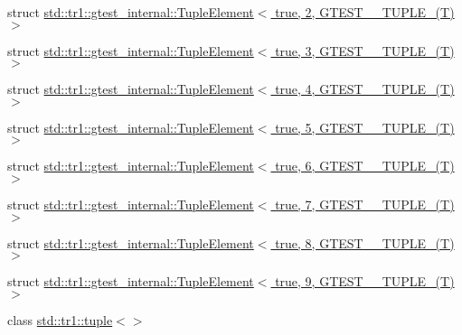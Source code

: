 \begin{DoxyCompactItemize}
\item 
struct \hyperlink{structstd_1_1tr1_1_1gtest__internal_1_1_tuple_element_3_01true_00_012_00_01_g_t_e_s_t__10___t_u_p_l_e___07_t_08_01_4}{std\-::tr1\-::gtest\-\_\-internal\-::\-Tuple\-Element$<$ true, 2, G\-T\-E\-S\-T\-\_\-\_\-\-T\-U\-P\-L\-E\-\_\-(\-T) $>$}
\item 
struct \hyperlink{structstd_1_1tr1_1_1gtest__internal_1_1_tuple_element_3_01true_00_013_00_01_g_t_e_s_t__10___t_u_p_l_e___07_t_08_01_4}{std\-::tr1\-::gtest\-\_\-internal\-::\-Tuple\-Element$<$ true, 3, G\-T\-E\-S\-T\-\_\-\_\-\-T\-U\-P\-L\-E\-\_\-(\-T) $>$}
\item 
struct \hyperlink{structstd_1_1tr1_1_1gtest__internal_1_1_tuple_element_3_01true_00_014_00_01_g_t_e_s_t__10___t_u_p_l_e___07_t_08_01_4}{std\-::tr1\-::gtest\-\_\-internal\-::\-Tuple\-Element$<$ true, 4, G\-T\-E\-S\-T\-\_\-\_\-\-T\-U\-P\-L\-E\-\_\-(\-T) $>$}
\item 
struct \hyperlink{structstd_1_1tr1_1_1gtest__internal_1_1_tuple_element_3_01true_00_015_00_01_g_t_e_s_t__10___t_u_p_l_e___07_t_08_01_4}{std\-::tr1\-::gtest\-\_\-internal\-::\-Tuple\-Element$<$ true, 5, G\-T\-E\-S\-T\-\_\-\_\-\-T\-U\-P\-L\-E\-\_\-(\-T) $>$}
\item 
struct \hyperlink{structstd_1_1tr1_1_1gtest__internal_1_1_tuple_element_3_01true_00_016_00_01_g_t_e_s_t__10___t_u_p_l_e___07_t_08_01_4}{std\-::tr1\-::gtest\-\_\-internal\-::\-Tuple\-Element$<$ true, 6, G\-T\-E\-S\-T\-\_\-\_\-\-T\-U\-P\-L\-E\-\_\-(\-T) $>$}
\item 
struct \hyperlink{structstd_1_1tr1_1_1gtest__internal_1_1_tuple_element_3_01true_00_017_00_01_g_t_e_s_t__10___t_u_p_l_e___07_t_08_01_4}{std\-::tr1\-::gtest\-\_\-internal\-::\-Tuple\-Element$<$ true, 7, G\-T\-E\-S\-T\-\_\-\_\-\-T\-U\-P\-L\-E\-\_\-(\-T) $>$}
\item 
struct \hyperlink{structstd_1_1tr1_1_1gtest__internal_1_1_tuple_element_3_01true_00_018_00_01_g_t_e_s_t__10___t_u_p_l_e___07_t_08_01_4}{std\-::tr1\-::gtest\-\_\-internal\-::\-Tuple\-Element$<$ true, 8, G\-T\-E\-S\-T\-\_\-\_\-\-T\-U\-P\-L\-E\-\_\-(\-T) $>$}
\item 
struct \hyperlink{structstd_1_1tr1_1_1gtest__internal_1_1_tuple_element_3_01true_00_019_00_01_g_t_e_s_t__10___t_u_p_l_e___07_t_08_01_4}{std\-::tr1\-::gtest\-\_\-internal\-::\-Tuple\-Element$<$ true, 9, G\-T\-E\-S\-T\-\_\-\_\-\-T\-U\-P\-L\-E\-\_\-(\-T) $>$}
\item 
class \hyperlink{classstd_1_1tr1_1_1tuple_3_4}{std\-::tr1\-::tuple$<$$>$}
\item 

\end{DoxyCompactItemize}
